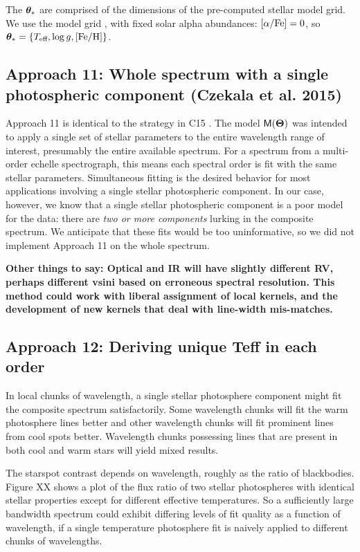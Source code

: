 \documentclass[twocolumn]{emulateapj}%
\newcommand{\iancze}{{\sc C15 }}
\begin{document}
The ${\bm \theta}_{\ast}$ are comprised of the dimensions of the pre-computed stellar model grid.  We use the \PHOENIX model grid \citep{husser13}, with fixed solar alpha abundances: $[\alpha/{\rm Fe}] = 0$, so ${\bm \theta}_{\ast} = \{T_\textrm{eff}, \log g, [{\rm Fe}/{\rm H}] \}$.




\subsection{Approach 11: Whole spectrum with a single photospheric component (Czekala et al. 2015)}

Approach 11 is identical to the strategy in \iancze.  The model $\mathsf{M}({\bm \Theta})$ was intended to apply a single set of stellar parameters to the entire wavelength range of interest, presumably the entire available spectrum.  For a spectrum from a multi-order echelle spectrograph, this means each spectral order is fit with the same stellar parameters.  Simultaneous fitting is the desired behavior for most applications involving a single stellar photospheric component.  In our case, however, we know that a single stellar photospheric component is a poor model for the data: there are \emph{two or more components} lurking in the composite spectrum.  We anticipate that these fits would be too uninformative, so we did not implement Approach 11 on the whole spectrum.

\textbf{Other things to say: Optical and IR will have slightly different RV, perhaps different vsini based on erroneous spectral resolution.  This method could work with liberal assignment of local kernels, and the development of new kernels that deal with line-width mis-matches.}

\subsection{Approach 12: Deriving unique Teff in each order}
\label{sec:approach12}

In local chunks of wavelength, a single stellar photosphere component might fit the composite spectrum satisfactorily.  Some wavelength chunks will fit the warm photosphere lines better and other wavelength chunks will fit prominent lines from cool spots better.  Wavelength chunks possessing lines that are present in both cool and warm stars will yield mixed results.

The starspot contrast depends on wavelength, roughly as the ratio of blackbodies.  Figure XX shows a plot of the flux ratio of two stellar photospheres with identical stellar properties except for different effective temperatures.  So a sufficiently large bandwidth spectrum could exhibit differing levels of fit quality as a function of wavelength, if a single temperature photosphere fit is naively applied to different chunks of wavelengths.  
\end{document}
